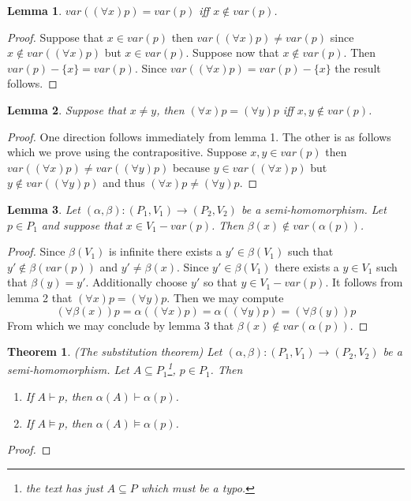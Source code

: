 \documentclass{article}
\theoremstyle{problemstyle}
\theoremstyle{lemmastyle}
\newtheorem{lemma}{Lemma}
\theoremstyle{theoremstyle}
\newtheorem{theorem}{Theorem}
\theoremstyle{problemstyle}
\theoremstyle{problemstyle}
\begin{document}
\begin{lemma}
$var((\forall x)p) = var(p)$ iff $x \notin var(p)$. 
\end{lemma}

\begin{proof}
Suppose that $x \in var(p)$ then $var((\forall x)p) \neq var(p)$ since $x \notin var((\forall x)p)$ but $x \in var(p)$. Suppose now that $x \notin var(p)$. Then $var(p)-\{x\} = var(p)$. Since $var((\forall x)p) = var(p) - \{x\}$ the result follows. 
\end{proof}

\begin{lemma}
Suppose that $x \neq y$, then $(\forall x)p = (\forall y)p$ iff $x,y \notin var(p)$.
\end{lemma}

\begin{proof}
One direction follows immediately from lemma 1. The other is as follows which we prove using the contrapositive. Suppose $x,y \in var(p)$ then $var((\forall x)p) \neq var((\forall y)p)$ because $y \in var((\forall x)p)$ but $y \notin var((\forall y)p)$ and thus $(\forall x)p \neq (\forall y)p$. 
\end{proof}

\begin{lemma}
Let $(\alpha,\beta):(P_1,V_1) \rightarrow (P_2,V_2)$ be a semi-homomorphism. Let $p \in P_1$ and suppose that $x \in V_1-var(p)$. Then $\beta(x) \notin var(\alpha(p))$.  
\end{lemma}

\begin{proof}
Since $\beta(V_1)$ is infinite there exists a $y' \in \beta(V_1)$ such that $y' \notin \beta(var(p))$ and $y' \neq \beta(x)$. Since $y' \in \beta(V_1)$ there exists a $y \in V_1$ such that $\beta(y) = y'$. Additionally choose $y'$ so that $y \in V_1-var(p)$.  It follows from lemma 2 that $(\forall x)p = (\forall y)p$. Then we may compute $$(\forall \beta(x))p = \alpha((\forall x) p) = \alpha((\forall y) p)=(\forall \beta(y))p$$
From which we may conclude by lemma 3 that $\beta(x) \notin var(\alpha(p))$. 
\end{proof}


\begin{theorem}(The substitution theorem) Let $(\alpha,\beta):(P_1,V_1) \rightarrow (P_2,V_2)$ be a semi-homomorphism. Let $A \subseteq P_1$\footnote{the text has just  $A \subseteq P$ which must be a typo.}, $p \in P_1$. Then

\begin{enumerate}[label = (\alph*)]

\item If $A \vdash p$, then $\alpha(A) \vdash \alpha(p)$.
\item If $A \models p$, then $\alpha(A) \models \alpha(p)$.

\end{enumerate}
\end{theorem}

\begin{proof}

\end{proof}
\end{document}
